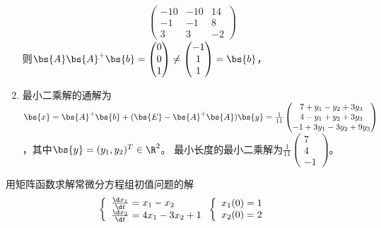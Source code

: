 \documentclass[12pt, a4paper, oneside, UTF8]{ctexbook}
\begin{document}
\begin{solution}
\begin{enumerate}[label=(\arabic{*})]
\begin{align*}
\begin{pmatrix}
           -10&-10&14\\
           -1&-1&8\\
           3&3&-2
        \end{pmatrix}
        \end{align*}
        则$\bs{A}\bs{A}^+\bs{b}=\begin{pmatrix}
            0\\
            0\\
            1
        \end{pmatrix} \neq \begin{pmatrix}
            -1\\
            1\\
            1
        \end{pmatrix}=\bs{b}$，
        \item 最小二乘解的通解为$\bs{x}=\bs{A}^+\bs{b}+(\bs{E}-\bs{A}^+\bs{A})\bs{y}
        =\frac{1}{11}\begin{pmatrix}
           7+y_1-y_2+3y_3\\
           4-y_1+y_2+3y_3\\
            -1+3y_1-3y_2+9y_3
        \end{pmatrix}$，其中$\bs{y}=(y_1,y_2)^T\in \R^2$。    
        最小长度的最小二乘解为$\frac{1}{11}\begin{pmatrix}
            7\\
            4\\
            -1
        \end{pmatrix}$。
    \end{enumerate}
\end{solution}

\begin{question}
    用矩阵函数求解常微分方程组初值问题的解
    \begin{align*}
    \left\{
        \begin{array}{ll}
            \frac{\d x_1}{\d t}=x_1-x_2\\
            \frac{\d x_2}{\d t}=4x_1-3x_2+1
        \end{array}
        \right.
    \left\{
        \begin{array}{ll}
            x_1(0)=1\\
            x_2(0)=2
        \end{array}
        \right.
    \end{align*}
\end{question}
\end{document}
